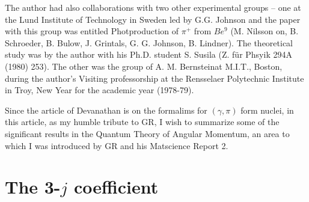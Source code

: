 The author had also collaborations with two other experimental groups -- one at 
the Lund Institute of Technology in Sweden led by G.G. Johnson and the paper with 
this group was  entitled Photproduction of $\pi^+$ from $Be^9$ (M. Nilsson on, 
B. Schroeder, B. Bulow, J. Grintals, G. G. Johnson, B. Lindner). The theoretical 
study was by the author with his Ph.D. student S. Susila (Z. für Phsyik 294A 
(1980) 253). The other was the group of A. M. Bernsteinat M.I.T., Boston, during the 
author's Visiting professorship at the Rensselaer Polytechnic Institute in Troy,
New Year for the academic year (1978-79).

Since the article of Devanathan is on the formalims for $(\gamma,\pi)$ form 
nuclei, in this article, as my humble tribute to GR, I wish to summarize some of 
the significant results in the Quantum Theory of Angular Momentum, an area to 
which I was introduced by GR and his Matscience Report 2.

\section*{The 3-$j$ coefficient}

